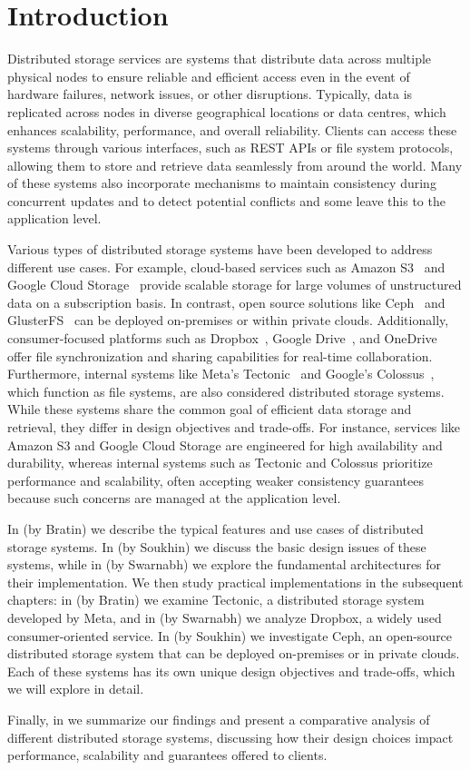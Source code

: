 \chapter{Introduction}\label{chap:intro}

Distributed storage services are systems that distribute data across multiple physical nodes to ensure reliable and efficient access even in the event of hardware failures, network issues, or other disruptions. Typically, data is replicated across nodes in diverse geographical locations or data centres, which enhances scalability, performance, and overall reliability. Clients can access these systems through various interfaces, such as REST APIs or file system protocols, allowing them to store and retrieve data seamlessly from around the world. Many of these systems also incorporate mechanisms to maintain consistency during concurrent updates and to detect potential conflicts and some leave this to the application level.

Various types of distributed storage systems have been developed to address different use cases. For example, cloud-based services such as Amazon S3~\cite{amazon_s3} and Google Cloud Storage~\cite{google_cloud_storage} provide scalable storage for large volumes of unstructured data on a subscription basis. In contrast, open source solutions like Ceph~\cite{ceph} and GlusterFS~\cite{glusterfs} can be deployed on-premises or within private clouds. Additionally, consumer-focused platforms such as Dropbox~\cite{dropbox}, Google Drive~\cite{google_drive}, and OneDrive~\cite{onedrive} offer file synchronization and sharing capabilities for real-time collaboration. Furthermore, internal systems like Meta's Tectonic~\cite{tectonic} and Google's Colossus~\cite{colossus}, which function as file systems, are also considered distributed storage systems. While these systems share the common goal of efficient data storage and retrieval, they differ in design objectives and trade-offs. For instance, services like Amazon S3 and Google Cloud Storage are engineered for high availability and durability, whereas internal systems such as Tectonic and Colossus prioritize performance and scalability, often accepting weaker consistency guarantees because such concerns are managed at the application level.

In  (by Bratin) we describe the typical features and use cases of distributed storage systems. In  (by Soukhin) we discuss the basic design issues of these systems, while in  (by Swarnabh) we explore the fundamental architectures for their implementation. We then study practical implementations in the subsequent chapters: in  (by Bratin) we examine Tectonic, a distributed storage system developed by Meta, and in  (by Swarnabh) we analyze Dropbox, a widely used consumer-oriented service. In  (by Soukhin) we investigate Ceph, an open-source distributed storage system that can be deployed on-premises or in private clouds. Each of these systems has its own unique design objectives and trade-offs, which we will explore in detail.

Finally, in  we summarize our findings and present a comparative analysis of different distributed storage systems, discussing how their design choices impact performance, scalability and guarantees offered to clients.
